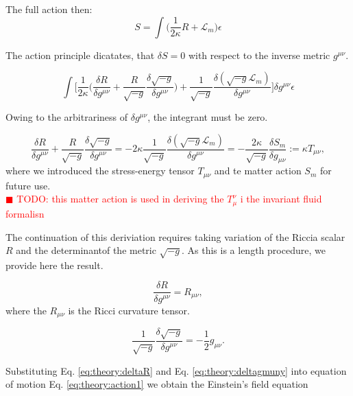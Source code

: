 \documentclass[11pt,a4paper,headinclude=true,DIV=14,BCOR=8mm,chapterprefix,listof=totoc,twoside,openright,abstracton]{scrbook}
\newcommand{\todo}[1]{\textcolor{red}{$\blacksquare$ TODO: #1}}
\begin{document}
The full action then:
\begin{equation}
    S = \int\Big(\frac{1}{2\kappa}R+\mathcal{L}_m\Big)\epsilon
\end{equation}

The action principle dicatates, that $\delta S = 0$  with respect to the inverse metric $g^{\mu\nu}$. 

\begin{equation}
    \int\Bigg[\frac{1}{2\kappa}\Big(\frac{\delta R}{\delta g^{\mu\nu}}+\frac{R}{\sqrt{-g}}\frac{\delta\sqrt{-g}}{\delta g^{\mu\nu}}\Big) + \frac{1}{\sqrt{-g}}\frac{\delta(\sqrt{-g}\mathcal{L}_m)}{\delta g^{\mu\nu}}\Bigg]\delta g^{\mu\nu}\epsilon
\end{equation}

Owing to the arbitrariness of $\delta g^{\mu\nu}$, the integrant must be zero. 

\begin{equation}
    \frac{\delta R}{\delta g^{\mu\nu}} + \frac{R}{\sqrt{-g}}\frac{\delta\sqrt{-g}}{\delta g^{\mu\nu}} = -2\kappa\frac{1}{\sqrt{-g}}\frac{\delta(\sqrt{-g}\mathcal{L}_m)}{\delta g^{\mu\nu}} = -\frac{2\kappa}{\sqrt{-g}}\frac{\delta S_m}{\delta g_{\mu\nu}} := \kappa T_{\mu\nu},
    \label{eq:theory:action1}
\end{equation}
where we introduced the stress-energy tensor $T_{\mu\nu}$ and te matter action $S_m$ for future use. \\

\todo{this matter action is used in deriving the $T_{\mu} ^{\nu}$ i the invariant fluid formalisn}

The continuation of this deriviation requires taking variation of the Riccia scalar $R$ and the determinantof the metric $\sqrt{-g}$. As this is a length procedure, we provide here the result. 

\begin{equation}
    \frac{\delta R}{\delta g^{\mu\nu}} = R_{\mu\nu},
    \label{eq:theory:deltaR}
\end{equation}
where the $R_{\mu\nu}$ is the Ricci curvature tensor.

\begin{equation}
    \frac{1}{\sqrt{-g}}\frac{\delta\sqrt{-g}}{\delta g^{\mu\nu}} = -\frac{1}{2}g_{\mu\nu}.
    \label{eq:theory:deltagmuny}
\end{equation}

Substituting Eq. \ref{eq:theory:deltaR} and Eq. \ref{eq:theory:deltagmuny} into equation of motion Eq.  \ref{eq:theory:action1} we obtain the Einstein's field equation 
\end{document}
